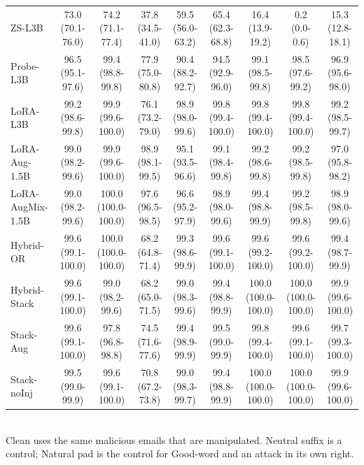 \begin{table}[t]
\begin{tabular}{lcccccccc}
ZS-L3B & 73.0 (70.1-76.0) & 74.2 (71.1-77.4) & 37.8 (34.5-41.0) & 59.5 (56.0-63.2) & 65.4 (62.3-68.8) & 16.4 (13.9-19.2) & 0.2 (0.0-0.6) & 15.3 (12.8-18.1) \\
Probe-L3B & 96.5 (95.1-97.6) & 99.4 (98.8-99.8) & 77.9 (75.0-80.8) & 90.4 (88.2-92.7) & 94.5 (92.9-96.0) & 99.1 (98.5-99.8) & 98.5 (97.6-99.2) & 96.9 (95.6-98.0) \\
LoRA-L3B & 99.2 (98.6-99.8) & 99.9 (99.6-100.0) & 76.1 (73.2-79.0) & 98.9 (98.0-99.6) & 99.8 (99.4-100.0) & 99.8 (99.4-100.0) & 99.8 (99.4-100.0) & 99.2 (98.5-99.7) \\
LoRA-Aug-1.5B & 99.0 (98.2-99.6) & 99.9 (99.6-100.0) & 98.9 (98.1-99.5) & 95.1 (93.5-96.6) & 99.1 (98.4-99.8) & 99.2 (98.6-99.8) & 99.2 (98.5-99.8) & 97.0 (95.8-98.2) \\
LoRA-AugMix-1.5B & 99.0 (98.2-99.6) & 100.0 (100.0-100.0) & 97.6 (96.5-98.5) & 96.6 (95.2-97.9) & 98.9 (98.0-99.6) & 99.4 (98.8-99.9) & 99.2 (98.5-99.8) & 98.9 (98.0-99.6) \\
Hybrid-OR & 99.6 (99.1-100.0) & 100.0 (100.0-100.0) & 68.2 (64.8-71.4) & 99.3 (98.6-99.9) & 99.6 (99.1-100.0) & 99.6 (99.2-100.0) & 99.6 (99.2-100.0) & 99.4 (98.7-99.9) \\
Hybrid-Stack & 99.6 (99.1-100.0) & 99.0 (98.2-99.6) & 68.2 (65.0-71.5) & 99.0 (98.3-99.6) & 99.4 (98.8-99.9) & 100.0 (100.0-100.0) & 100.0 (100.0-100.0) & 99.9 (99.6-100.0) \\
Stack-Aug & 99.6 (99.1-100.0) & 97.8 (96.8-98.8) & 74.5 (71.6-77.6) & 99.4 (98.9-99.9) & 99.5 (99.0-99.9) & 99.8 (99.4-100.0) & 99.6 (99.1-100.0) & 99.7 (99.3-100.0) \\
Stack-noInj & 99.5 (99.0-99.9) & 99.6 (99.1-100.0) & 70.8 (67.2-73.8) & 99.0 (98.3-99.7) & 99.4 (98.8-99.9) & 100.0 (100.0-100.0) & 100.0 (100.0-100.0) & 99.9 (99.6-100.0) \\
\bottomrule
\end{tabular}
\\[2pt]{\scriptsize Clean uses the same malicious emails that are manipulated. Neutral suffix is a control; Natural pad is the control for Good-word and an attack in its own right.}
\end{table}